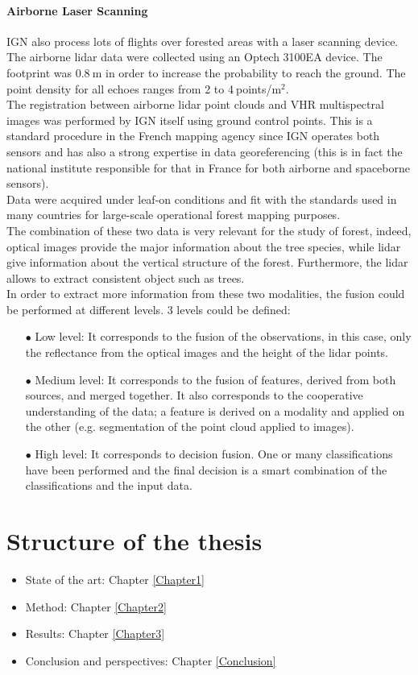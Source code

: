 \paragraph{Airborne Laser Scanning \\}
IGN also process lots of flights over forested areas with a laser scanning device. The airborne lidar data were collected using an Optech 3100EA device. The footprint was 0.8$\:$m in order to increase the probability to reach the ground. The point density {for all echoes} ranges from 2 to 4$\:$points/m$^{2}$. \\

The registration between airborne lidar point clouds and VHR multispectral images was performed by IGN itself using ground control points. This is a standard procedure in the French mapping agency since IGN operates both sensors and has also a strong expertise in data georeferencing (this is in fact the national institute responsible for that in France for both airborne and spaceborne sensors). \\
Data were acquired under leaf-on conditions and fit with the standards used in many countries for large-scale operational forest mapping purposes. \\

The combination of these two data is very relevant for the study of forest, indeed, optical images provide the major information about the tree species, while lidar give information about the vertical structure of the forest. Furthermore, the lidar allows to extract consistent object such as trees. \\

In order to extract more information from these two modalities, the fusion could be performed at different levels. 3 levels could be defined:
\begin{itemize}
\item[$\bullet$] Low level: It corresponds to the fusion of the observations, in this case, only the reflectance from the optical images and the height of the lidar points.
\item[$\bullet$] Medium level: It corresponds to the fusion of features, derived from both sources, and merged together. It also corresponds to the cooperative understanding of the data; a feature is derived on a modality and applied on the other (e.g. segmentation of the point cloud applied to images).
\item[$\bullet$] High level: It corresponds to decision fusion. One or many classifications have been performed and the final decision is a smart combination of the classifications and the input data.
\end{itemize}

\section{Structure of the thesis}

\begin{itemize}
\item State of the art: Chapter \ref{Chapter1}
\item Method: Chapter \ref{Chapter2}
\item Results: Chapter \ref{Chapter3}
\item Conclusion and perspectives: Chapter \ref{Conclusion}
\end{itemize}

\stopcontents[chapters]
